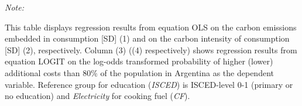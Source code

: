 \begin{table}[htbp!]
\begin{adjustbox}{width = 1\textwidth, max height = 0.95\textheight, center}
\begin{threeparttable}[b]
         \begin{tablenotes}\item \medskip \textit{Note:}
            \item This table displays regression results from equation OLS on the carbon emissions embedded in consumption [SD] (1) and on the carbon intensity of consumption [SD] (2), respectively. 
                                      Column (3) ((4) respectively) shows regression results from equation LOGIT on the log-odds transformed probability of higher (lower) additional costs than 80\% of the population in Argentina as the dependent variable. Reference group for education (\textit{ISCED}) is ISCED-level 0-1 (primary or no education) and \textit{Electricity} for cooking fuel (\textit{CF}).
         \end{tablenotes}
      \end{threeparttable}
   \end{adjustbox}
\end{table}


